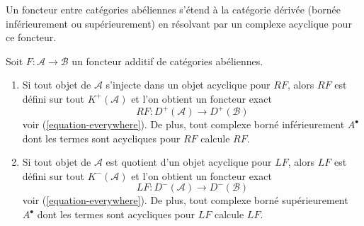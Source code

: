 \begin{proposition}
\label{proposition-enough-acyclics}
\begin{slogan}
Un foncteur entre catégories abéliennes s'étend à la catégorie dérivée (bornée
inférieurement ou supérieurement) en résolvant par un complexe acyclique pour
ce foncteur.
\end{slogan}
Soit $F : \mathcal{A} \to \mathcal{B}$ un foncteur additif de catégories
abéliennes.
\begin{enumerate}
\item Si tout objet de $\mathcal{A}$ s'injecte dans un objet acyclique pour
$RF$, alors $RF$ est défini sur tout $K^{+}(\mathcal{A})$ et l'on obtient un
foncteur exact
$$
RF : D^{+}(\mathcal{A}) \longrightarrow D^{+}(\mathcal{B})
$$
voir (\ref{equation-everywhere}). De plus, tout complexe borné inférieurement
$A^\bullet$ dont les termes sont acycliques pour $RF$ calcule $RF$.
\item Si tout objet de $\mathcal{A}$ est quotient d'un objet acyclique pour
$LF$, alors $LF$ est défini sur tout $K^{-}(\mathcal{A})$ et l'on obtient un
foncteur exact
$$
LF : D^{-}(\mathcal{A}) \longrightarrow D^{-}(\mathcal{B})
$$
voir (\ref{equation-everywhere}). De plus, tout complexe borné supérieurement
$A^\bullet$ dont les termes sont acycliques pour $LF$ calcule $LF$.
\end{enumerate}
\end{proposition}

